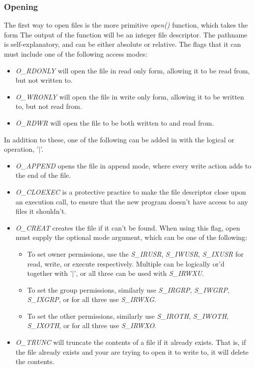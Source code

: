 \documentclass{article}
\begin{document}
\subsubsection{Opening}
The first way to open files is the more primitive \textit{open()} function, which takes the form
The output of the function will be an integer file descriptor. The pathname is self-explanatory, and can be either absolute or relative. The flags that it can must include one of the following access modes:
\begin{itemize}
    \item \textit{O\_RDONLY} will open the file in read only form, allowing it to be read from, but not written to.
    \item \textit{O\_WRONLY} will open the file in write only form, allowing it to be written to, but not read from.
    \item \textit{O\_RDWR} will open the file to be both written to and read from.
\end{itemize}
In addition to these, one of the following can be added in with the logical or operation, '$|$'.
\begin{itemize}
    \item \textit{O\_APPEND} opens the file in append mode, where every write action adds to the end of the file.
    \item \textit{O\_CLOEXEC} is a protective practice to make the file descriptor close upon an execution call, to ensure that the new program doesn't have access to any files it shouldn't.
    \item \textit{O\_CREAT} creates the file if it can't be found. When using this flag, open must supply the optional mode argument, which can be one of the following:
    \begin{itemize}
        \item To set owner permissions, use the \textit{S\_IRUSR}, \textit{S\_IWUSR}, \textit{S\_IXUSR} for read, write, or execute respectively. Multiple can be logically or'd together with '$|$', or all three can be used with \textit{S\_IRWXU}.
        \item To set the group permissions, similarly use \textit{S\_IRGRP}, \textit{S\_IWGRP}, \textit{S\_IXGRP}, or for all three use \textit{S\_IRWXG}.
        \item To set the other permissions, similarly use \textit{S\_IROTH}, \textit{S\_IWOTH}, \textit{S\_IXOTH}, or for all three use \textit{S\_IRWXO}.
    \end{itemize}
    \item \textit{O\_TRUNC} will truncate the contents of a file if it already exists. That is, if the file already exists and your are trying to open it to write to, it will delete the contents.
\end{itemize}
\end{document}
